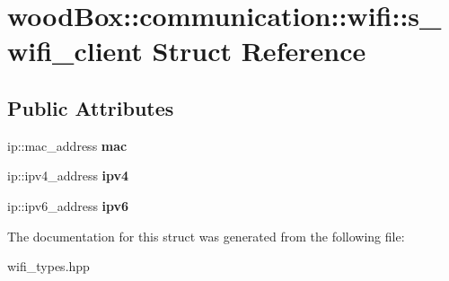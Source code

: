 \hypertarget{structwood_box_1_1communication_1_1wifi_1_1s__wifi__client}{}\section{wood\+Box\+:\+:communication\+:\+:wifi\+:\+:s\+\_\+wifi\+\_\+client Struct Reference}
\label{structwood_box_1_1communication_1_1wifi_1_1s__wifi__client}
\subsection*{Public Attributes}
\begin{DoxyCompactItemize}
\item 
\mbox{\label{structwood_box_1_1communication_1_1wifi_1_1s__wifi__client_a0c2a084f86b4588303015c0301bc8825}} 
ip\+::mac\+\_\+address {\bfseries mac}
\item 
\mbox{\label{structwood_box_1_1communication_1_1wifi_1_1s__wifi__client_afe0ae3583e2155c21e14d2376581b6ed}} 
ip\+::ipv4\+\_\+address {\bfseries ipv4}
\item 
\mbox{\label{structwood_box_1_1communication_1_1wifi_1_1s__wifi__client_a7a17a029a3d33f6d7f03ee6507d38d8d}} 
ip\+::ipv6\+\_\+address {\bfseries ipv6}
\end{DoxyCompactItemize}


The documentation for this struct was generated from the following file\+:\begin{DoxyCompactItemize}
\item 
wifi\+\_\+types.\+hpp\end{DoxyCompactItemize}
